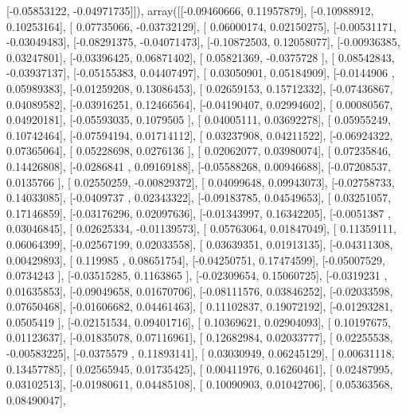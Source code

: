\documentclass{article}
\begin{document}
       [-0.05853122, -0.04971735]]), array([[-0.09460666,  0.11957879],
       [-0.10988912,  0.10253164],
       [ 0.07735066, -0.03732129],
       [ 0.06000174,  0.02150275],
       [-0.00531171, -0.03049483],
       [-0.08291375, -0.04071473],
       [-0.10872503,  0.12058077],
       [-0.00936385,  0.03247801],
       [-0.03396425,  0.06871402],
       [ 0.05821369, -0.0375728 ],
       [ 0.08542843, -0.03937137],
       [-0.05155383,  0.04407497],
       [ 0.03050901,  0.05184909],
       [-0.0144906 ,  0.05989383],
       [-0.01259208,  0.13086453],
       [ 0.02659153,  0.15712332],
       [-0.07436867,  0.04089582],
       [-0.03916251,  0.12466564],
       [-0.04190407,  0.02994602],
       [ 0.00080567,  0.04920181],
       [-0.05593035,  0.1079505 ],
       [ 0.04005111,  0.03692278],
       [ 0.05955249,  0.10742464],
       [-0.07594194,  0.01714112],
       [ 0.03237908,  0.04211522],
       [-0.06924322,  0.07365064],
       [ 0.05228698,  0.0276136 ],
       [ 0.02062077,  0.03980074],
       [ 0.07235846,  0.14426808],
       [-0.0286841 ,  0.09169188],
       [-0.05588268,  0.00946688],
       [-0.07208537,  0.0135766 ],
       [ 0.02550259, -0.00829372],
       [ 0.04099648,  0.09943073],
       [-0.02758733,  0.14033085],
       [-0.0409737 ,  0.02343322],
       [-0.09183785,  0.04549653],
       [ 0.03251057,  0.17146859],
       [-0.03176296,  0.02097636],
       [-0.01343997,  0.16342205],
       [-0.0051387 ,  0.03046845],
       [ 0.02625334, -0.01139573],
       [ 0.05763064,  0.01847049],
       [ 0.11359111,  0.06064399],
       [-0.02567199,  0.02033558],
       [ 0.03639351,  0.01913135],
       [-0.04311308,  0.00429893],
       [ 0.119985  ,  0.08651754],
       [-0.04250751,  0.17474599],
       [-0.05007529,  0.0734243 ],
       [-0.03515285,  0.1163865 ],
       [-0.02309654,  0.15060725],
       [-0.0319231 ,  0.01635853],
       [-0.09049658,  0.01670706],
       [-0.08111576,  0.03846252],
       [-0.02033598,  0.07650468],
       [-0.01606682,  0.04461463],
       [ 0.11102837,  0.19072192],
       [-0.01293281,  0.0505419 ],
       [-0.02151534,  0.09401716],
       [ 0.10369621,  0.02904093],
       [ 0.10197675,  0.01123637],
       [-0.01835078,  0.07116961],
       [ 0.12682984,  0.02033777],
       [ 0.02255538, -0.00583225],
       [-0.0375579 ,  0.11893141],
       [ 0.03030949,  0.06245129],
       [ 0.00631118,  0.13457785],
       [ 0.02565945,  0.01735425],
       [ 0.00411976,  0.16260461],
       [ 0.02487995,  0.03102513],
       [-0.01980611,  0.04485108],
       [ 0.10090903,  0.01042706],
       [ 0.05363568,  0.08490047],
\end{document}
